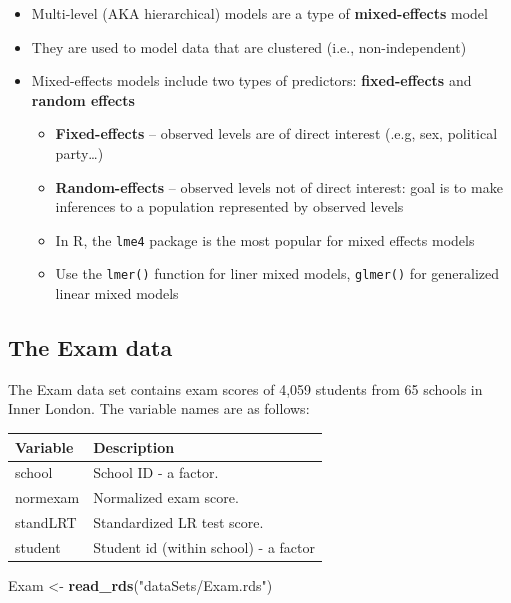 \documentclass[
]{book}
\newenvironment{Shaded}{\begin{snugshade}}{\end{snugshade}}
\newcommand{\KeywordTok}[1]{\textcolor[rgb]{0.13,0.29,0.53}{\textbf{#1}}}
\newcommand{\NormalTok}[1]{#1}
\newcommand{\StringTok}[1]{\textcolor[rgb]{0.31,0.60,0.02}{#1}}
\providecommand{\tightlist}{%
  \setlength{\itemsep}{0pt}\setlength{\parskip}{0pt}}
\begin{document}
\begin{itemize}
\tightlist
\item
  Multi-level (AKA hierarchical) models are a type of \textbf{mixed-effects} model
\item
  They are used to model data that are clustered (i.e., non-independent)
\item
  Mixed-effects models include two types of predictors: \textbf{fixed-effects} and \textbf{random effects}

  \begin{itemize}
  \tightlist
  \item
    \textbf{Fixed-effects} -- observed levels are of direct interest (.e.g, sex, political party\ldots)
  \item
    \textbf{Random-effects} -- observed levels not of direct interest: goal is to make inferences to a population represented by observed levels
  \item
    In R, the \texttt{lme4} package is the most popular for mixed effects models
  \item
    Use the \texttt{lmer()} function for liner mixed models, \texttt{glmer()} for generalized linear mixed models
  \end{itemize}
\end{itemize}

\hypertarget{the-exam-data}{%
\subsection{The Exam data}\label{the-exam-data}}

The Exam data set contains exam scores of 4,059 students from 65 schools in Inner London. The variable names are as follows:

\begin{longtable}[]{@{}ll@{}}
\toprule
Variable & Description\tabularnewline
\midrule
\endhead
school & School ID - a factor.\tabularnewline
normexam & Normalized exam score.\tabularnewline
standLRT & Standardized LR test score.\tabularnewline
student & Student id (within school) - a factor\tabularnewline
\bottomrule
\end{longtable}

\begin{Shaded}
\begin{Highlighting}[]
\NormalTok{  Exam \textless{}{-}}\StringTok{ }\KeywordTok{read\_rds}\NormalTok{(}\StringTok{"dataSets/Exam.rds"}\NormalTok{)}
\end{Highlighting}
\end{Shaded}
\end{document}
